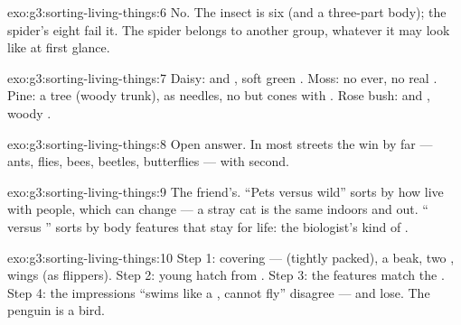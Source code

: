 \begin{solution}{exo:g3:sorting-living-things:6}
No. The insect  is six  (and a three-part body); the
spider's eight  fail it. The spider belongs to another group,
whatever it may look like at first glance.
\end{solution}

\begin{solution}{exo:g3:sorting-living-things:7}
Daisy:  and , soft green . Moss: no  ever,
no real . Pine: a tree (woody trunk),  as needles, no
 but cones with . Rose bush:  and , woody
.
\end{solution}

\begin{solution}{exo:g3:sorting-living-things:8}
Open answer. In most streets the  win by far --- ants,
flies, bees, beetles, butterflies --- with  second.
\end{solution}

\begin{solution}{exo:g3:sorting-living-things:9}
The friend's. ``Pets versus wild'' sorts by how  live with
people, which can change --- a stray cat is the same 
indoors and out. `` versus '' sorts by body features
that stay for life: the biologist's kind of .
\end{solution}

\begin{solution}{exo:g3:sorting-living-things:10}
Step 1: covering ---  (tightly packed), a beak, two ,
wings (as flippers). Step 2: young hatch from . Step 3: the
features match the . Step 4: the impressions ``swims like a
, cannot fly'' disagree --- and lose. The penguin is a bird.
\end{solution}

